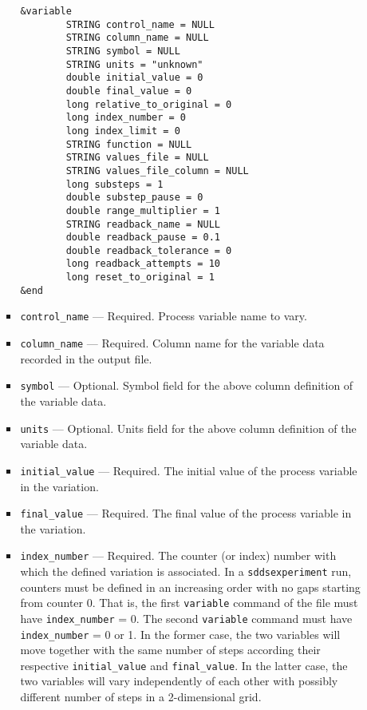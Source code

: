 \begin{itemize}
\begin{itemize}
\begin{itemize}
\begin{verbatim}
&variable
        STRING control_name = NULL
        STRING column_name = NULL
        STRING symbol = NULL
        STRING units = "unknown"
        double initial_value = 0
        double final_value = 0
        long relative_to_original = 0
        long index_number = 0
        long index_limit = 0
        STRING function = NULL
        STRING values_file = NULL
        STRING values_file_column = NULL
        long substeps = 1
        double substep_pause = 0
        double range_multiplier = 1
        STRING readback_name = NULL
        double readback_pause = 0.1
        double readback_tolerance = 0
        long readback_attempts = 10
        long reset_to_original = 1
&end        
\end{verbatim}
        \item {\verb+control_name+} --- Required. Process variable name to vary. 
        \item {\verb+column_name+} --- Required. Column name for the variable data recorded in the output file.
        \item {\verb+symbol+} --- Optional. Symbol field for the above column definition of the variable data.
        \item {\verb+units+} --- Optional. Units field for the above column definition of the variable data.
        \item {\verb+initial_value+} --- Required. The initial value of the process variable in the variation.
        \item {\verb+final_value+} --- Required. The final value of the process variable in the variation.
        \item {\verb+index_number+} --- Required. The counter (or index) number with which
                the defined variation is associated. In a \verb+sddsexperiment+ run, counters must
                be defined in an increasing order with no gaps starting from counter 0. That is,
                the first {\verb+variable+} command of the 
                file must have {\verb+index_number+} = 0. The second {\verb+variable+} command
                must have {\verb+index_number+} = 0 or 1. In the former case, the two variables
                will move together with the same number of steps according their respective
                {\verb+initial_value+} and {\verb+final_value+}. In the latter
                case, the two variables will vary independently of each other with possibly different
                number of steps in a 2-dimensional grid.


\end{itemize}
\end{itemize}
\end{itemize}
